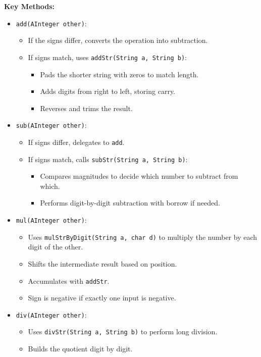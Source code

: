 \documentclass[11pt]{article}
\begin{document}
\textbf{Key Methods:}
\begin{itemize}
  \item \texttt{add(AInteger other)}:
    \begin{itemize}
      \item If the signs differ, converts the operation into subtraction.
      \item If signs match, uses \texttt{addStr(String a, String b)}:
        \begin{itemize}
          \item Pads the shorter string with zeros to match length.
          \item Adds digits from right to left, storing carry.
          \item Reverses and trims the result.
        \end{itemize}
    \end{itemize}
  \item \texttt{sub(AInteger other)}:
    \begin{itemize}
      \item If signs differ, delegates to \texttt{add}.
      \item If signs match, calls \texttt{subStr(String a, String b)}:
        \begin{itemize}
          \item Compares magnitudes to decide which number to subtract from which.
          \item Performs digit-by-digit subtraction with borrow if needed.
        \end{itemize}
    \end{itemize}
  \item \texttt{mul(AInteger other)}:
    \begin{itemize}
      \item Uses \texttt{mulStrByDigit(String a, char d)} to multiply the number by each digit of the other.
      \item Shifts the intermediate result based on position.
      \item Accumulates with \texttt{addStr}.
      \item Sign is negative if exactly one input is negative.
    \end{itemize}
  \item \texttt{div(AInteger other)}:
    \begin{itemize}
      \item Uses \texttt{divStr(String a, String b)} to perform long division.
      \item Builds the quotient digit by digit.

\end{itemize}
\end{itemize}
\end{document}
